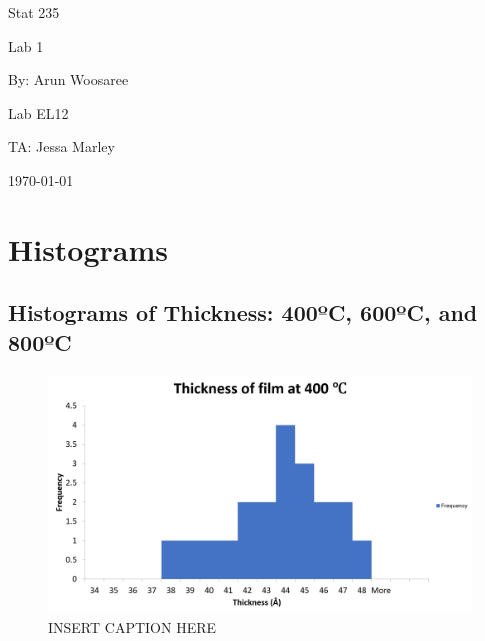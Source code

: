 \documentclass[letterpaper]{article}
\begin{document}
\begin{titlepage}
 \begin{center}
  \vspace*{1cm}
  \Huge
  Stat 235
  \vspace{1cm}

  Lab 1
  \vspace{1cm}

  By: Arun Woosaree
  \vspace{1cm}

  \Huge
  Lab EL12
  \vspace{1cm}

  TA: Jessa Marley
  \vspace{1cm}

  \today
  \vfill
 \end{center}
\end{titlepage}

\section{Histograms}

  \subsection{Histograms of Thickness: 400ºC, 600ºC, and 800ºC}

    \begin{figure}[H]
      \centering
      \includegraphics[width=\textwidth]{thicc400.png}
      \caption{INSERT CAPTION HERE}
      \label{thicc400}
    \end{figure}
\end{document}

